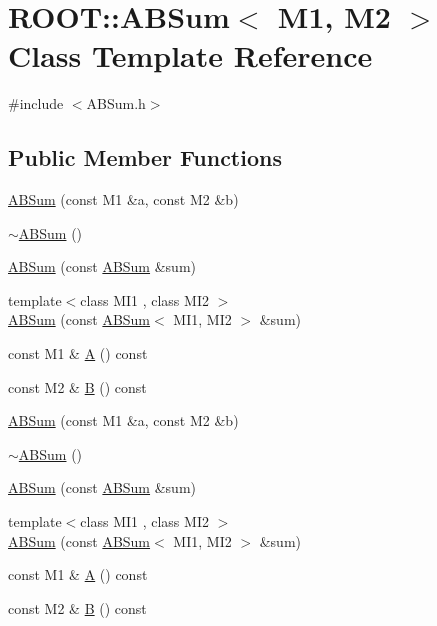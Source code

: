 \hypertarget{classROOT_1_1Minuit2_1_1ABSum}{}\section{R\+O\+OT\+:\+:A\+B\+Sum$<$ M1, M2 $>$ Class Template Reference}
\label{classROOT_1_1Minuit2_1_1ABSum}


{\ttfamily \#include $<$A\+B\+Sum.\+h$>$}

\subsection*{Public Member Functions}
\begin{DoxyCompactItemize}
\item 
\mbox{\hyperlink{classROOT_1_1Minuit2_1_1ABSum_adaac8ec05b73e9e86e736faab9a685fe}{A\+B\+Sum}} (const M1 \&a, const M2 \&b)
\item 
\mbox{\hyperlink{classROOT_1_1Minuit2_1_1ABSum_ab2d4441bcbcb38be86091d5eda7b63b2}{$\sim$\+A\+B\+Sum}} ()
\item 
\mbox{\hyperlink{classROOT_1_1Minuit2_1_1ABSum_ae687b46f660f6db5ca9c4626fd5e5a4b}{A\+B\+Sum}} (const \mbox{\hyperlink{classROOT_1_1Minuit2_1_1ABSum}{A\+B\+Sum}} \&sum)
\item 
{\footnotesize template$<$class M\+I1 , class M\+I2 $>$ }\\\mbox{\hyperlink{classROOT_1_1Minuit2_1_1ABSum_a4f9776ad68bfb91ccf613b367ecf6730}{A\+B\+Sum}} (const \mbox{\hyperlink{classROOT_1_1Minuit2_1_1ABSum}{A\+B\+Sum}}$<$ M\+I1, M\+I2 $>$ \&sum)
\item 
const M1 \& \mbox{\hyperlink{classROOT_1_1Minuit2_1_1ABSum_a079b47b55709bd81d820c277aa389b4f}{A}} () const
\item 
const M2 \& \mbox{\hyperlink{classROOT_1_1Minuit2_1_1ABSum_a6370bd6e7593778d1933ef761dad2449}{B}} () const
\item 
\mbox{\hyperlink{classROOT_1_1Minuit2_1_1ABSum_adaac8ec05b73e9e86e736faab9a685fe}{A\+B\+Sum}} (const M1 \&a, const M2 \&b)
\item 
\mbox{\hyperlink{classROOT_1_1Minuit2_1_1ABSum_ab2d4441bcbcb38be86091d5eda7b63b2}{$\sim$\+A\+B\+Sum}} ()
\item 
\mbox{\hyperlink{classROOT_1_1Minuit2_1_1ABSum_ae687b46f660f6db5ca9c4626fd5e5a4b}{A\+B\+Sum}} (const \mbox{\hyperlink{classROOT_1_1Minuit2_1_1ABSum}{A\+B\+Sum}} \&sum)
\item 
{\footnotesize template$<$class M\+I1 , class M\+I2 $>$ }\\\mbox{\hyperlink{classROOT_1_1Minuit2_1_1ABSum_a4f9776ad68bfb91ccf613b367ecf6730}{A\+B\+Sum}} (const \mbox{\hyperlink{classROOT_1_1Minuit2_1_1ABSum}{A\+B\+Sum}}$<$ M\+I1, M\+I2 $>$ \&sum)
\item 
const M1 \& \mbox{\hyperlink{classROOT_1_1Minuit2_1_1ABSum_a079b47b55709bd81d820c277aa389b4f}{A}} () const
\item 
const M2 \& \mbox{\hyperlink{classROOT_1_1Minuit2_1_1ABSum_a6370bd6e7593778d1933ef761dad2449}{B}} () const
\end{DoxyCompactItemize}


